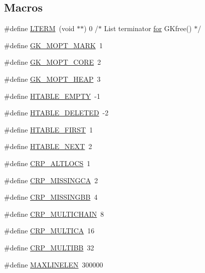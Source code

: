 \subsection*{Macros}
\begin{DoxyCompactItemize}
\item 
\#define \hyperlink{a00044_ad187417622643f86341db4a2e1cf6a37}{L\+T\+E\+RM}~(void $\ast$$\ast$) 0     /$\ast$ List terminator \hyperlink{a00623_ad1e7380d51df1e0043d24d3c8a860e0a}{for} G\+Kfree() $\ast$/
\item 
\#define \hyperlink{a00044_aba10735d4825d315387264e288c460cf}{G\+K\+\_\+\+M\+O\+P\+T\+\_\+\+M\+A\+RK}~1
\item 
\#define \hyperlink{a00044_adbabd09406c36a2df0dcd3afa0defab3}{G\+K\+\_\+\+M\+O\+P\+T\+\_\+\+C\+O\+RE}~2
\item 
\#define \hyperlink{a00044_a526a14bc248b31efad34b6de2d25533d}{G\+K\+\_\+\+M\+O\+P\+T\+\_\+\+H\+E\+AP}~3
\item 
\#define \hyperlink{a00044_abc40241ea961a33128e422e7fa99c34a}{H\+T\+A\+B\+L\+E\+\_\+\+E\+M\+P\+TY}~-\/1
\item 
\#define \hyperlink{a00044_a8502ce76742e054e9c22f924b66efda9}{H\+T\+A\+B\+L\+E\+\_\+\+D\+E\+L\+E\+T\+ED}~-\/2
\item 
\#define \hyperlink{a00044_ae6a99b9ff281a249d9adadbf5a502c25}{H\+T\+A\+B\+L\+E\+\_\+\+F\+I\+R\+ST}~1
\item 
\#define \hyperlink{a00044_a60cca34c4e9ec0a8ea577286d9306ff4}{H\+T\+A\+B\+L\+E\+\_\+\+N\+E\+XT}~2
\item 
\#define \hyperlink{a00044_aa436841e3b8155142edb2c3995a68bb1}{C\+R\+P\+\_\+\+A\+L\+T\+L\+O\+CS}~1
\item 
\#define \hyperlink{a00044_a55732d1ba07d5d0281f699453f946222}{C\+R\+P\+\_\+\+M\+I\+S\+S\+I\+N\+G\+CA}~2
\item 
\#define \hyperlink{a00044_a181db9994e7081a27bc6af91006b6774}{C\+R\+P\+\_\+\+M\+I\+S\+S\+I\+N\+G\+BB}~4
\item 
\#define \hyperlink{a00044_ad33974dff4c58cdb1cc16844d7a86868}{C\+R\+P\+\_\+\+M\+U\+L\+T\+I\+C\+H\+A\+IN}~8
\item 
\#define \hyperlink{a00044_a78b9a8c1992c85de5b87a0166887fe93}{C\+R\+P\+\_\+\+M\+U\+L\+T\+I\+CA}~16
\item 
\#define \hyperlink{a00044_aa0e956deb129dde7d6533b5fba458298}{C\+R\+P\+\_\+\+M\+U\+L\+T\+I\+BB}~32
\item 
\#define \hyperlink{a00044_a624dbcb8b6ccc24c9bf891c174f60b6d}{M\+A\+X\+L\+I\+N\+E\+L\+EN}~300000
\item 
$$
\end{DoxyCompactItemize}
